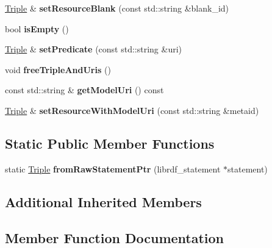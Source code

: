 \begin{DoxyCompactItemize}
\hyperlink{classomexmeta_1_1Triple}{Triple} \& {\bfseries set\+Resource\+Blank} (const std\+::string \&blank\+\_\+id)
\item 
\mbox{\label{classomexmeta_1_1Triple_a34832780748d58b0fddea6f6f079217a}} 
bool {\bfseries is\+Empty} ()
\item 
\mbox{\label{classomexmeta_1_1Triple_a1a99a566a9d1883c6329a023f4dbc056}} 
\hyperlink{classomexmeta_1_1Triple}{Triple} \& {\bfseries set\+Predicate} (const std\+::string \&uri)
\item 
\mbox{\label{classomexmeta_1_1Triple_ab89993902b551b98d9e17e4fe5ebed6b}} 
void {\bfseries free\+Triple\+And\+Uris} ()
\item 
\mbox{\label{classomexmeta_1_1Triple_ac379e5410a41c1946e91d581f023c7f5}} 
const std\+::string \& {\bfseries get\+Model\+Uri} () const
\item 
\mbox{\label{classomexmeta_1_1Triple_a44d31389b0056ab4f1d8689521a25032}} 
\hyperlink{classomexmeta_1_1Triple}{Triple} \& {\bfseries set\+Resource\+With\+Model\+Uri} (const std\+::string \&metaid)
\end{DoxyCompactItemize}
\subsection*{Static Public Member Functions}
\begin{DoxyCompactItemize}
\item 
\mbox{\label{classomexmeta_1_1Triple_af03c0ce3392c0ff30f13772209ac873c}} 
static \hyperlink{classomexmeta_1_1Triple}{Triple} {\bfseries from\+Raw\+Statement\+Ptr} (librdf\+\_\+statement $\ast$statement)
\end{DoxyCompactItemize}
\subsection*{Additional Inherited Members}


\subsection{Member Function Documentation}
\mbox{\label{classomexmeta_1_1Triple_aabfef726172656b6c61c602b4d8d33e5}} 
